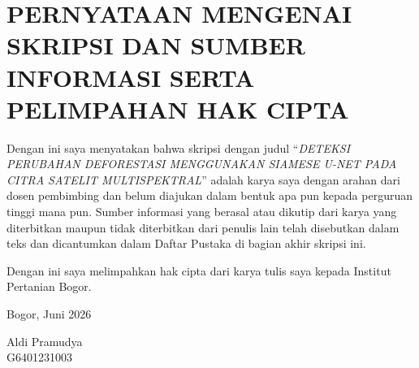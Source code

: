 
\chapter*{PERNYATAAN MENGENAI SKRIPSI DAN SUMBER INFORMASI SERTA PELIMPAHAN HAK CIPTA}

Dengan ini saya menyatakan bahwa skripsi dengan judul
``\textit{DETEKSI PERUBAHAN DEFORESTASI MENGGUNAKAN SIAMESE U-NET PADA
CITRA SATELIT MULTISPEKTRAL}''
adalah karya saya dengan arahan dari dosen pembimbing dan belum diajukan
dalam bentuk apa pun kepada perguruan tinggi mana pun.
Sumber informasi yang berasal atau dikutip dari karya yang diterbitkan
maupun tidak diterbitkan dari penulis lain telah disebutkan dalam teks
dan dicantumkan dalam Daftar Pustaka di bagian akhir skripsi ini.

Dengan ini saya melimpahkan hak cipta dari karya tulis saya kepada
Institut Pertanian Bogor.

\vspace{2cm}

\noindent
Bogor, Juni 2026

\vspace{2cm}

\noindent
Aldi Pramudya\\
G6401231003
